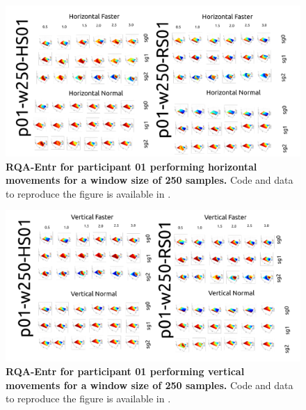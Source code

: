 \documentclass[12pt]{article}
\begin{document}


\newpage
\begin{figure}[ht!]
\centering
\includegraphics{sm-fig03}
    	\caption{
	{\bf RQA-Entr for participant 01 performing horizontal movements for a window size of 250 samples.}
	Code and data to reproduce the figure is available in \cite{srep2021}.
        }
    \label{fig-p01-H-w250}
\end{figure}
\begin{figure}[hb!]
\centering
\includegraphics{sm-fig04}
    	\caption{
	{\bf RQA-Entr for participant 01 performing vertical movements for a window size of 250 samples.}
	Code and data to reproduce the figure is available in \cite{srep2021}.
        }
    \label{fig-p01-V-w250}
\end{figure}
\end{document}
